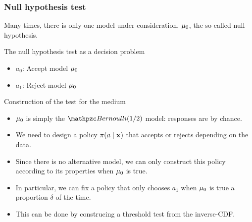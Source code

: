 \begin{frame}
  \frametitle{Null hypothesis test}
  Many times, there is only one model under consideration, $\mu_0$, the so-called \alert{null hypothesis}. 
  \begin{block}{The null hypothesis test as a decision problem}
    \begin{itemize}
    \item $a_0$: Accept model $\mu_0$
    \item $a_1$: Reject model $\mu_0$
    \end{itemize}
  \end{block}

  \begin{example}{Construction of the test for the medium}
  \begin{itemize}
  \item<2-> $\mu_0$ is simply the $\Bernoulli(1/2)$ model: responses are by chance.
  \item<3-> We need to design a policy $\pi(a \mid {\mathbf{x}})$ that accepts or rejects depending on the data.
  \item<4-> Since there is no alternative model, we can only construct this policy according to its properties when $\mu_0$ is true.
  \item<5-> In particular, we can fix a policy that only chooses $a_1$ when $\mu_0$ is true a proportion $\delta$ of the time.
  \item<6-> This can be done by construcing a threshold test from the inverse-CDF.
  \end{itemize}
\end{example}
\end{frame}
